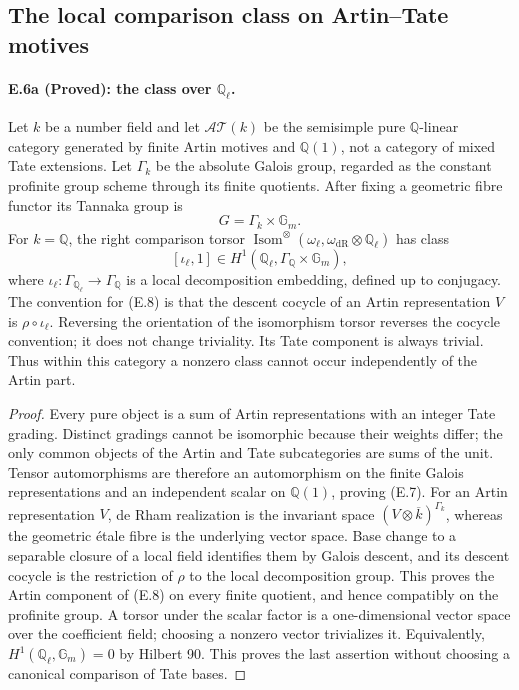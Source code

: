 \subsection{The local comparison class on Artin--Tate motives}
\label{sec:real-weil-E6}

\paragraph{E.6a (Proved): the class over $\mathbb Q_\ell$.}
Let $k$ be a number field and let $\mathcal{AT}(k)$ be the semisimple pure
$\mathbb Q$-linear category generated by finite Artin motives and
$\mathbb Q(1)$, not a category of mixed Tate extensions. Let $\Gamma_k$
be the absolute Galois group, regarded as the constant profinite group
scheme through its finite quotients. After fixing a geometric fibre
functor its Tannaka group is
\[
 G=\Gamma_k\times\mathbb G_m.
 \tag{E.7}
\]
For $k=\mathbb Q$, the right comparison torsor
$\operatorname{Isom}^{\otimes}(\omega_\ell,
\omega_{\mathrm{dR}}\otimes\mathbb Q_\ell)$ has class
\[
 [\iota_\ell,1]\in
 H^1(\mathbb Q_\ell,\Gamma_{\mathbb Q}\times\mathbb G_m),
 \tag{E.8}
\]
where $\iota_\ell:\Gamma_{\mathbb Q_\ell}\to\Gamma_{\mathbb Q}$ is a
local decomposition embedding, defined up to conjugacy. The convention
for (E.8) is that the descent cocycle of an Artin representation $V$ is
$\rho\circ\iota_\ell$. Reversing the orientation of the isomorphism
torsor reverses the cocycle convention; it does not change triviality.
Its Tate component is always trivial. Thus within this category a
nonzero class cannot occur independently of the Artin part.

\begin{proof}
Every pure object is a sum of Artin representations with an integer
Tate grading. Distinct gradings cannot be isomorphic because their
weights differ; the only common objects of the Artin and Tate
subcategories are sums of the unit. Tensor automorphisms are therefore
an automorphism on the finite Galois representations and an independent
scalar on $\mathbb Q(1)$, proving (E.7).
For an Artin representation $V$, de Rham realization is the invariant
space $(V\otimes\overline k)^{\Gamma_k}$, whereas the geometric \'etale
fibre is the underlying vector space. Base change to a separable closure
of a local field identifies them by Galois descent, and its descent
cocycle is the restriction of $\rho$ to the local decomposition group.
This proves the Artin component of (E.8) on every finite quotient,
and hence compatibly on the profinite group. A torsor under the scalar
factor is a one-dimensional vector space over the coefficient field;
choosing a nonzero vector trivializes it. Equivalently,
$H^1(\mathbb Q_\ell,\mathbb G_m)=0$ by Hilbert 90. This proves the last
assertion without choosing a canonical comparison of Tate bases.
\end{proof}


